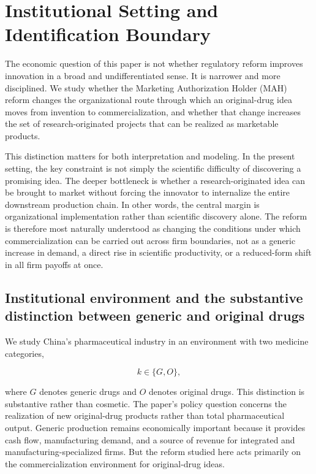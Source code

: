 \documentclass[12pt]{article}
\begin{document}
\section{Institutional Setting and Identification Boundary}

The economic question of this paper is not whether regulatory reform improves innovation in a broad and undifferentiated sense. It is narrower and more disciplined. We study whether the Marketing Authorization Holder (MAH) reform changes the organizational route through which an original-drug idea moves from invention to commercialization, and whether that change increases the set of research-originated projects that can be realized as marketable products.

This distinction matters for both interpretation and modeling. In the present setting, the key constraint is not simply the scientific difficulty of discovering a promising idea. The deeper bottleneck is whether a research-originated idea can be brought to market without forcing the innovator to internalize the entire downstream production chain. In other words, the central margin is organizational implementation rather than scientific discovery alone. The reform is therefore most naturally understood as changing the conditions under which commercialization can be carried out across firm boundaries, not as a generic increase in demand, a direct rise in scientific productivity, or a reduced-form shift in all firm payoffs at once.

\subsection{Institutional environment and the substantive distinction between generic and original drugs}

We study China's pharmaceutical industry in an environment with two medicine categories,

\[
k \in \{G,O\},
\]

where $G$ denotes generic drugs and $O$ denotes original drugs. This distinction is substantive rather than cosmetic. The paper's policy question concerns the realization of new original-drug products rather than total pharmaceutical output. Generic production remains economically important because it provides cash flow, manufacturing demand, and a source of revenue for integrated and manufacturing-specialized firms. But the reform studied here acts primarily on the commercialization environment for original-drug ideas.
\end{document}
